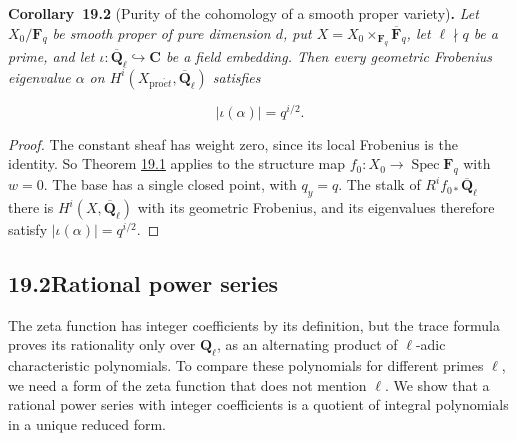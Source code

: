 \documentclass[11pt]{article}
\newenvironment{bpstatement}[2]{\par\addvspace{0.6\baselineskip}\noindent\textbf{#1}#2\textbf{.}\enspace\ignorespaces}
  {\par\addvspace{0.4\baselineskip}}
\newenvironment{bpstatementit}[2]{\begin{bpstatement}{#1}{#2}\itshape\ignorespaces}{\end{bpstatement}}
\begin{document}
\label{bp326}%
\begin{bpstatementit}{Corollary~19.2}{ (Purity of the cohomology of a smooth proper variety)}
Let \(X_0/\mathbf F_q\) be smooth proper of pure dimension \(d\), put \(X=X_0\times_{\mathbf F_q}\overline{\mathbf F}_q\), let \(\ell\nmid q\) be a prime, and let \(\iota:\overline{\mathbf Q}_\ell\hookrightarrow\mathbf C\) be a field embedding. Then every geometric Frobenius eigenvalue \(\alpha\) on \(H^i(X_{\mathrm{pro}\acute{e}t},\overline{\mathbf Q}_\ell)\) satisfies

\[
|\iota(\alpha)|=q^{i/2}.
\]
\end{bpstatementit}

\begin{proof}[{Proof}]\label{bp327}%
The constant sheaf has weight zero, since its local Frobenius is the identity. So Theorem \hyperref[bp323]{19.1} applies to the structure map \(f_0:X_0\to\operatorname{Spec}\mathbf F_q\) with \(w=0\). The base has a single closed point, with \(q_y=q\). The stalk of \(R^if_{0*}\overline{\mathbf Q}_\ell\) there is \(H^i(X,\overline{\mathbf Q}_\ell)\) with its geometric Frobenius, and its eigenvalues therefore satisfy \(|\iota(\alpha)|=q^{i/2}\).
\end{proof}


\subsection*{\texorpdfstring{19.2\quad Rational power series}{19.2 Rational power series}}
\label{bp328}%
\label{bp329}%
The zeta function has integer coefficients by its definition, but the trace formula proves its rationality only over \(\mathbf Q_\ell\), as an alternating product of \(\ell\)-adic characteristic polynomials. To compare these polynomials for different primes \(\ell\), we need a form of the zeta function that does not mention \(\ell\). We show that a rational power series with integer coefficients is a quotient of integral polynomials in a unique reduced form.
\end{document}
